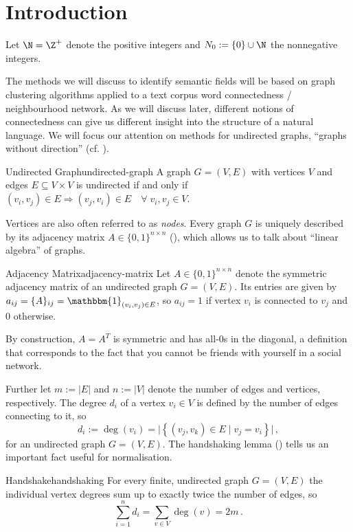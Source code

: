 \documentclass[12pt, a4paper]{article}
\newcommand{\identity}{\mathbbm{1}}
\begin{document}
  \pagebreak
  \section{Introduction}
  Let $\N = \Z^+$ denote the positive integers and $N_0 := \{0\} \cup \N$ the nonnegative integers.

  The methods we will discuss to identify semantic fields will be based on graph clustering algorithms applied to a text corpus word connectedness / neighbourhood network.
  As we will discuss later, different notions of connectedness can give us different insight into the structure of a natural language.
  We will focus our attention on methods for undirected graphs, ``graphs without direction'' (cf. ).
  \begin{definition}{Undirected Graph}{undirected-graph}
    A graph $G = (V, E)$ with vertices $V$ and edges $E \subseteq V \times V$ is undirected if and only if $(v_i, v_j) \in E \Rightarrow (v_j, v_i) \in E \quad \forall\; v_i, v_j \in V$.
  \end{definition}

  Vertices are also often referred to as \textit{nodes}.
  Every graph $G$ is uniquely described by its adjacency matrix $A \in \{0, 1\}^{n \times n}$ (), which allows us to talk about ``linear algebra'' of graphs.

  \begin{definition}{Adjacency Matrix}{adjacency-matrix}
    Let $A \in \{0, 1\}^{n \times n}$ denote the symmetric adjacency matrix of an undirected graph $G = (V, E)$. Its entries are given by $a_{ij} = \{A\}_{ij} = \identity_{(v_i, v_j) \in E}$, so $a_{ij} = 1$ if vertex $v_i$ is connected to $v_j$ and $0$ otherwise.
  \end{definition}

  By construction, $A = A^T$ is symmetric and has all-$0$s in the diagonal, a definition that corresponds to the fact that you cannot be friends with yourself in a social network.

  Further let $m := |E|$ and $n := |V|$ denote the number of edges and vertices, respectively.
  The degree $d_i$ of a vertex $v_i \in V$ is defined by the number of edges connecting to it, so $$d_i := \deg(v_i) = \big|\left\{(v_j, v_k) \in E \;|\; v_j = v_i\right\}\big|\,,$$ for an undirected graph $G = (V, E)$. The handshaking lemma () tells us an important fact useful for normalisation.
  \begin{lemma}{Handshake}{handshaking}
    For every finite, undirected graph $G = (V, E)$ the individual vertex degrees sum up to exactly twice the number of edges, so $$\sum_{i=1}^{n} d_i = \sum_{v \in V} \deg(v) = 2m\,.$$
  \end{lemma}
\end{document}
